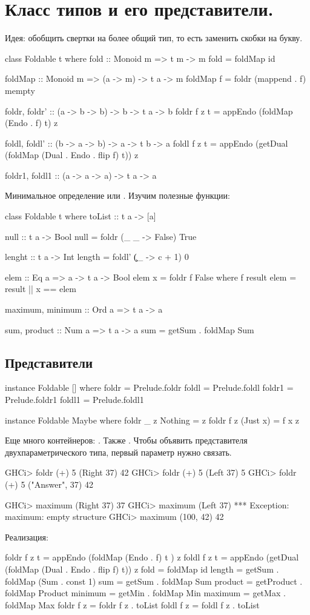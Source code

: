 \documentclass[11pt,a4paper]{article}
\begin{document}
\section{Класс типов  и его представители.}
Идея: обобщить свертки на более общий тип, то есть  заменить скобки на букву.
\begin{hscode}
class Foldable t where
  fold :: Monoid m => t m -> m
  fold = foldMap id

  foldMap :: Monoid m => (a -> m) -> t a -> m
  foldMap f = foldr (mappend . f) mempty

  foldr, foldr' :: (a -> b -> b) -> b -> t a -> b
  foldr f z t = appEndo (foldMap (Endo . f) t) z

  foldl, foldl' :: (b -> a -> b) -> a -> t b -> a
  foldl f z t = appEndo (getDual (foldMap (Dual . Endo . flip f) t)) z

  foldr1, foldl1 :: (a -> a -> a) -> t a -> a
\end{hscode}
Минимальное определение  или  .
Изучим  полезные функции:
\begin{hscode}
class Foldable t where
  toList :: t a -> [a]

  null :: t a -> Bool
  null = foldr (\_ _ -> False) True

  lenght :: t a -> Int
  length = foldl' (\c _ -> c + 1) 0

  elem :: Eq a => a -> t a -> Bool
  elem x = foldr f False
             where f result elem = result || x == elem 
  
  maximum, minimum :: Ord a => t a -> a

  sum, product :: Num a => t a -> a
  sum = getSum . foldMap Sum
\end{hscode}
\subsection{Представители}
\begin{hscode}
instance Foldable [] where
  foldr = Prelude.foldr
  foldl = Prelude.foldl
  foldr1 = Prelude.foldr1
  foldl1 = Prelude.foldl1

instance Foldable Maybe where
  foldr _ z Nothing = z
  foldr f z (Just x) = f x z
\end{hscode}
Еще много контейнеров: . Также . Чтобы объявить представителя двухпараметрического типа, первый параметр нужно связать.
\begin{hscode}
GHCi> foldr (+) 5 (Right 37)
42
GHCi> foldr (+) 5 (Left 37)
5
GHCi> foldr (+) 5 ("Answer", 37)
42

GHCi> maximum (Right 37)
37
GHCi> maximum (Left 37)
*** Exception: maximum: empty structure
GHCi> maximum (100, 42)
42
\end{hscode}
Реализация:
\begin{hscode}
foldr f z t = appEndo (foldMap (Endo . f) t ) z
foldl f z t = appEndo
  (getDual (foldMap (Dual . Endo . flip f) t)) z
fold        = foldMap id
length      = getSum . foldMap (Sum . const 1)
sum         = getSum . foldMap Sum
product     = getProduct . foldMap Product
minimum     = getMin . foldMap Min
maximum     = getMax . foldMap Max
foldr f z   = foldr f z . toList
foldl f z   = foldl f z . toList 
\end{hscode}
\end{document}
